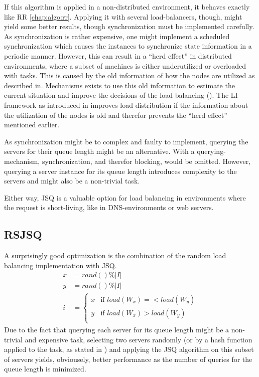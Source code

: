 If this algorithm is applied in a non-distributed environment, it behaves
exactly like \ac{RR} \ref{chap:algo:rr}.
Applying it with several load-balancers, though, might yield some better
results, though synchronization must be implemented carefully.
As synchronization is rather expensive, one might implement a scheduled
synchronization which causes the instances to synchronize state information in a
periodic manner.
However, this can result in a ``herd effect'' in distributed environments,
where a subset of machines is either underutilized or overloaded with tasks.
This is caused by the old information of how the nodes are
utilized as described in.
Mechanisms exists to use this old information to estimate the current situation
and improve the decisions of the load balancing (\cite{inpSLoadInfo}).
The LI framework as introduced in \cite{inpSLoadInfo} improves load distribution
if the information about the utilization of the nodes is old and therefor
prevents the ``herd effect'' mentioned earlier.

As synchronization might be to complex and faulty to implement, querying the
servers for their queue length might be an alternative.
With a querying-mechanism, synchronization, and therefor blocking, would be
omitted.
However, querying a server instance for its queue length introduces complexity
to the servers and might also be a non-trivial task.

Either way, \ac{JSQ} is a valuable option for load balancing in environments
where the request is short-living, like in \ac{DNS}-environments or web servers.

\subsection{\ac{RSJSQ}}

A surprisingly good optimization is the combination of the random load balancing
implementation with \ac{JSQ}.
\begin{equation}
    \begin{aligned}
        x &= rand() \% |I| \\
        y &= rand() \% |I| \\
        i &= \begin{cases}
            x & \text{if } load(W_x) =< load(W_y)\\
            y & \text{if } load(W_x) > load(W_y)\\
        \end{cases}
    \end{aligned}
    \label{eq:randjsq}
\end{equation}
Due to the fact that querying each server for its queue length
might be a non-trivial and expensive task,
selecting two servers randomly (or by a hash function applied to the task, as
stated in \cite{powerOfTwoRandomChoices}) and applying the \ac{JSQ} algorithm on
this subset of servers yields, obviousely, better performance as the number of
queries for the queue length is minimized.

